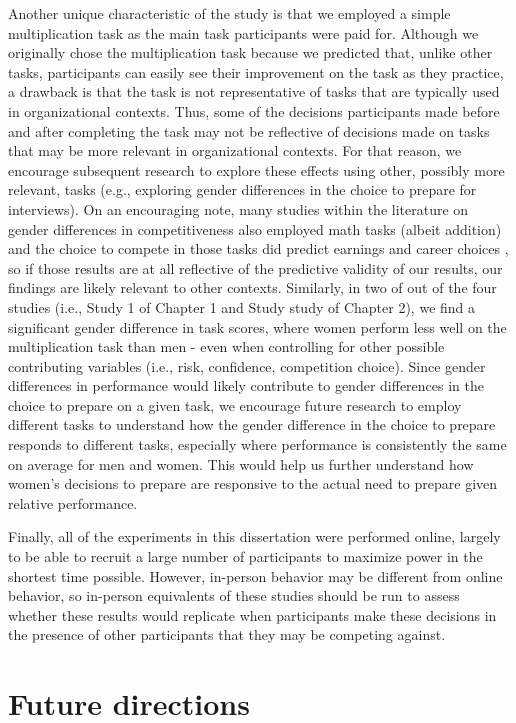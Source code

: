 \documentclass[letterpaper, nobind]{templates/ociamthesis}
\begin{document}
Another unique characteristic of the study is that we employed a simple multiplication task as the main task participants were paid for. Although we originally chose the multiplication task because we predicted that, unlike other tasks, participants can easily see their improvement on the task as they practice, a drawback is that the task is not representative of tasks that are typically used in organizational contexts. Thus, some of the decisions participants made before and after completing the task may not be reflective of decisions made on tasks that may be more relevant in organizational contexts. For that reason, we encourage subsequent research to explore these effects using other, possibly more relevant, tasks (e.g., exploring gender differences in the choice to prepare for interviews). On an encouraging note, many studies within the literature on gender differences in competitiveness also employed math tasks (albeit addition) and the choice to compete in those tasks did predict earnings and career choices \autocite{Reuben2017,Buser2014}, so if those results are at all reflective of the predictive validity of our results, our findings are likely relevant to other contexts. Similarly, in two of out of the four studies (i.e., Study 1 of Chapter 1 and Study study of Chapter 2), we find a significant gender difference in task scores, where women perform less well on the multiplication task than men - even when controlling for other possible contributing variables (i.e., risk, confidence, competition choice). Since gender differences in performance would likely contribute to gender differences in the choice to prepare on a given task, we encourage future research to employ different tasks to understand how the gender difference in the choice to prepare responds to different tasks, especially where performance is consistently the same on average for men and women. This would help us further understand how women's decisions to prepare are responsive to the actual need to prepare given relative performance.

Finally, all of the experiments in this dissertation were performed online, largely to be able to recruit a large number of participants to maximize power in the shortest time possible. However, in-person behavior may be different from online behavior, so in-person equivalents of these studies should be run to assess whether these results would replicate when participants make these decisions in the presence of other participants that they may be competing against.

\hypertarget{future-directions}{%
\section{Future directions}\label{future-directions}}
\end{document}
